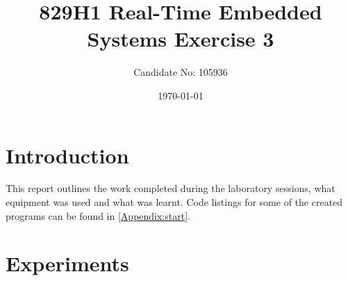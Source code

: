 \documentclass[a4paper,12pt]{scrartcl}
\title{829H1 Real-Time Embedded Systems Exercise 3}
\author{Candidate No: 105936}
\date{\today}
\begin{document}
	
	\begin{titlepage}
		\maketitle
	\end{titlepage}
	
	\tableofcontents
	\newpage
	
	\section{Introduction}
	{
		This report outlines the work completed during the laboratory sessions, what equipment was used and what was learnt. Code listings for some of the created programs can be found in \cref{Appendix:start}.
	}

	\section{Experiments}
\end{document}
